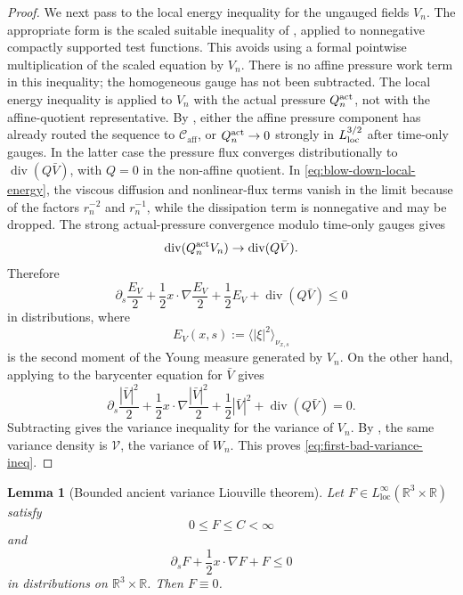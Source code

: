 \documentclass[11pt]{amsart}
\numberwithin{equation}{section}
\theoremstyle{plain}
\newtheorem{lemma}[lemma]{Lemma}
\theoremstyle{definition}
\theoremstyle{remark}
\newcommand{\loc}{\mathrm{loc}}
\newcommand{\divergence}{\operatorname{div}}
\newcommand{\Caff}{\mathcal C_{\mathrm{aff}}}
\begin{document}
\begin{proof}
We next pass to the local energy inequality for the ungauged fields \(V_n\).
The appropriate form is the scaled suitable inequality of
, applied to nonnegative compactly supported
test functions.  This avoids using a formal pointwise multiplication of the
scaled equation by \(V_n\).  There is no affine pressure work term in this
inequality; the homogeneous gauge has not been subtracted.  The local energy
inequality is applied to \(V_n\) with the actual pressure
\(Q_n^{\rm act}\), not with the affine-quotient representative.  By
, either the affine pressure
component has already routed the sequence to \(\Caff\), or
\(Q_n^{\rm act}\to0\) strongly in \(L^{3/2}_{\rm loc}\) after time-only gauges.
In the latter case the pressure flux converges distributionally to
\(\divergence(Q\bar V)\), with \(Q=0\) in the non-affine quotient.  In
\eqref{eq:blow-down-local-energy}, the viscous diffusion and nonlinear-flux
terms vanish in the limit because of the factors \(r_n^{-2}\) and
\(r_n^{-1}\), while the dissipation term is nonnegative and may be dropped.
The strong actual-pressure convergence modulo time-only gauges gives
\[
   \divergence(Q_n^{\rm act}V_n)\to\divergence(Q\bar V).
\]
Therefore
\[
   \partial_s\frac{E_V}{2}
   +\frac12x\cdot\nabla\frac{E_V}{2}
   +\frac12E_V
   +\divergence(Q\bar V)
   \le0
\]
in distributions, where
\[
   E_V(x,s):=\langle|\xi|^2\rangle_{\nu_{x,s}}
\]
is the second moment of the Young measure generated by \(V_n\).  On the other
hand, applying  to the
barycenter equation for \(\bar V\) gives
\[
   \partial_s\frac{|\bar V|^2}{2}
   +\frac12x\cdot\nabla\frac{|\bar V|^2}{2}
   +\frac12|\bar V|^2
   +\divergence(Q\bar V)=0 .
\]
Subtracting gives the variance inequality for the variance of \(V_n\).  By
, the same variance density is
\(\mathcal V\), the variance of \(W_n\).  This proves
\eqref{eq:first-bad-variance-ineq}.
\end{proof}

\begin{lemma}[Bounded ancient variance Liouville theorem]
\label{lem:bounded-variance-liouville}
Let \(F\in L^\infty_{\loc}(\mathbb R^3\times\mathbb R)\) satisfy
\[
   0\le F\le C<\infty
\]
and
\[
   \partial_sF+\frac12x\cdot\nabla F+F\le0
\]
in distributions on \(\mathbb R^3\times\mathbb R\).  Then \(F\equiv0\).
\end{lemma}
\end{document}
